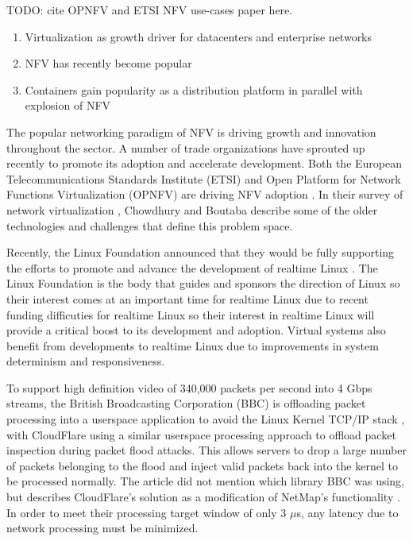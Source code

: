 TODO: cite OPNFV and ETSI NFV use-cases paper here.
\begin{enumerate}
  \item Virtualization as growth driver for datacenters and enterprise networks
  \item NFV has recently become popular 
  \item Containers gain popularity as a distribution platform in parallel with explosion of NFV
\end{enumerate}

The popular networking paradigm of NFV is driving growth and innovation throughout the sector.
A number of trade organizations have sprouted up recently to promote its adoption and accelerate development.
Both the European Telecommunications Standards Institute (ETSI) and Open Platform for Network Functions Virtualization (OPNFV) \autocite{opnfv1} are driving NFV adoption \autocite{cohnopnfv}.
In their survey of network virtualization \autocite{_chowdhury_1}, Chowdhury and Boutaba describe some of the older technologies and challenges that define this problem space.


Recently, the Linux Foundation announced that they would be fully supporting the efforts to promote and advance the development of realtime Linux \autocite{_linux_foundation_1}.
The Linux Foundation is the body that guides and sponsors the direction of Linux so their interest comes at an important time for realtime Linux due to recent funding difficuties for realtime Linux \autocite{_lwn_1} so their interest in realtime Linux will provide a critical boost to its development and adoption.
Virtual systems also benefit from developments to realtime Linux due to improvements in system determinism and responsiveness.

To support high definition video of 340,000 packets per second into 4 Gbps streams, the British Broadcasting Corporation (BBC) is offloading packet processing into a userspace application to avoid the Linux Kernel TCP/IP stack \autocite{bbcbypass}, with CloudFlare using a similar userspace processing approach to offload packet inspection during packet flood attacks.
This allows servers to drop a large number of packets belonging to the flood and inject valid packets back into the kernel to be processed normally.  
The article did not mention which library BBC was using, but describes CloudFlare's solution as a modification of NetMap's functionality \autocite{netmapbertin}.
In order to meet their processing target window of only 3 $\mu$s, any latency due to network processing must be minimized.

